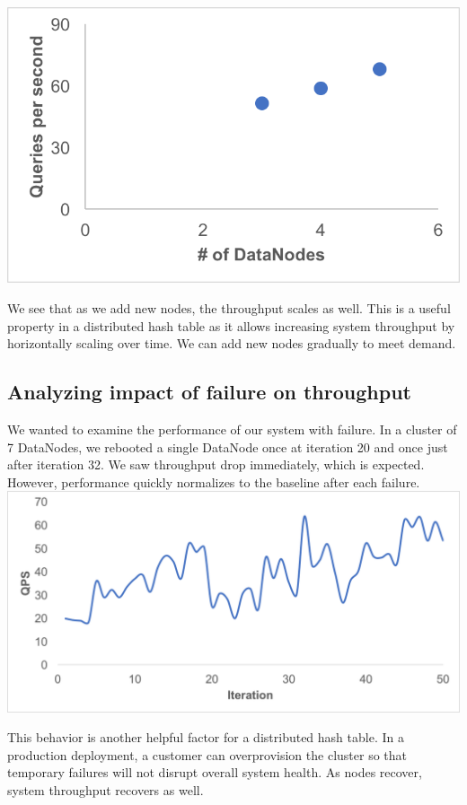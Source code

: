 \documentclass[paper=a4,fontsize=11pt]{report} %
\numberwithin{equation}{section} %
\numberwithin{figure}{section} %
\numberwithin{table}{section} %
\begin{document}
\noindent\includegraphics[width=.65\textwidth]{LinearScaling.png}

We see that as we add new nodes, the throughput scales as well. This is a useful property in a distributed hash table as it allows increasing system throughput by horizontally scaling over time. We can add new nodes gradually to meet demand.

\subsection{Analyzing impact of failure on throughput}
We wanted to examine the performance of our system with failure. In a cluster of 7 DataNodes, we rebooted a single DataNode once at iteration 20 and once just after iteration 32. We saw throughput drop immediately, which is expected. However, performance quickly normalizes to the baseline after each failure.\\

\noindent\includegraphics[width=\textwidth]{throughput_failiure.png}

This behavior is another helpful factor for a distributed hash table. In a production deployment, a customer can overprovision the cluster so that temporary failures will not disrupt overall system health. As nodes recover, system throughput recovers as well.
\end{document}
